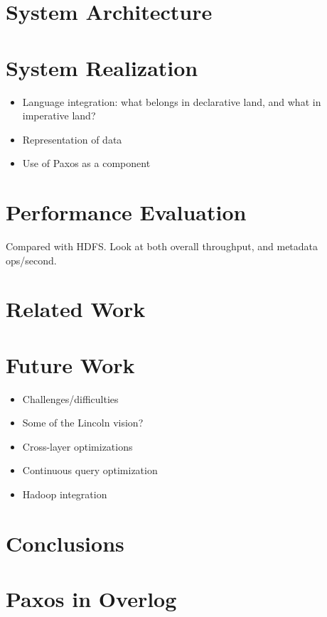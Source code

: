\documentclass{article}
\begin{document}
\section{System Architecture}

\section{System Realization}
\begin{itemize}
\item
  Language integration: what belongs in declarative land, and what in
  imperative land?

\item
  Representation of data

\item
  Use of Paxos as a component
\end{itemize}

\section{Performance Evaluation}
Compared with HDFS. Look at both overall throughput, and metadata ops/second.

\section{Related Work}

\section{Future Work}
\begin{itemize}
\item
  Challenges/difficulties

\item
  Some of the Lincoln vision?

\item
  Cross-layer optimizations

\item
  Continuous query optimization

\item
  Hadoop integration
\end{itemize}

\section{Conclusions}


\appendix
\section{Paxos in Overlog}
\end{document}
